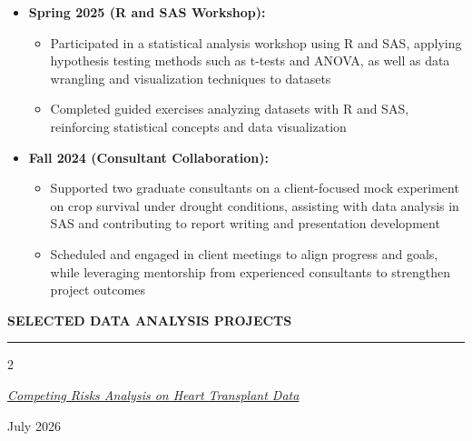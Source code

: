 \documentclass[
  16,
]{article}
\begin{document}
\begin{itemize}
\item
  \textbf{Spring 2025 (R and SAS Workshop):}

  \begin{itemize}
  \item
    Participated in a statistical analysis workshop using R and SAS,
    applying hypothesis testing methods such as t-tests and ANOVA, as
    well as data wrangling and visualization techniques to datasets
  \item
    Completed guided exercises analyzing datasets with R and SAS,
    reinforcing statistical concepts and data visualization
  \end{itemize}
\item
  \textbf{Fall 2024 (Consultant Collaboration):}

  \begin{itemize}
  \item
    Supported two graduate consultants on a client-focused mock
    experiment on crop survival under drought conditions, assisting with
    data analysis in SAS and contributing to report writing and
    presentation development
  \item
    Scheduled and engaged in client meetings to align progress and
    goals, while leveraging mentorship from experienced consultants to
    strengthen project outcomes
  \end{itemize}
\end{itemize}

\vspace{3pt}

\begin{large}{\bf SELECTED DATA ANALYSIS PROJECTS}
  \vspace{3pt}
  \hrule   
  \begin{multicols}{2}
    \begin{flushleft}
  \textit{\href{https://vimeo.com/reviews/3c2baaba-72f5-45e4-a2a8-455757f4b1d8/videos/1203908829}{Competing Risks Analysis on Heart Transplant Data}}
  \end{flushleft}
    \begin{flushright}
    July 2026\end{flushright}
    \end{multicols}
  \vspace{-0.17cm}
\end{large}
\vspace{-0.16cm}
\end{document}

